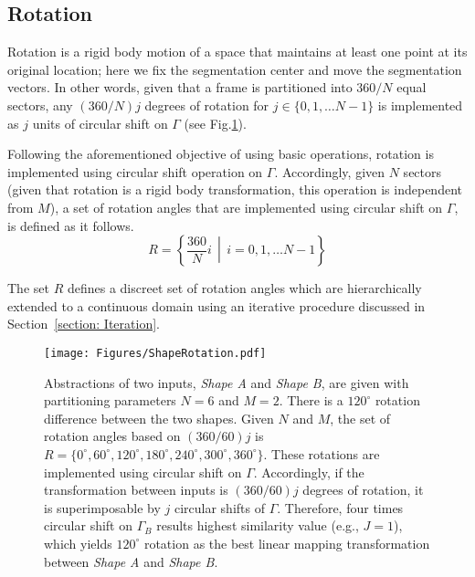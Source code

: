 \subsection{Rotation} \label{section: Rotation}
Rotation is a rigid body motion of a space that maintains at least one point at its original location; here we fix the segmentation center and move the segmentation vectors. In other words, given that a frame is partitioned into $360/N$ equal sectors, any $(360/N)j$ degrees of rotation for $j \in \{0, 1, \dots N-1\}$ is implemented as $j$ units of circular shift on $\Gamma$ (see Fig.\ref{Figure: ShapeRotation}).

Following the aforementioned objective of using basic operations, rotation is implemented using circular shift operation on $\Gamma$. Accordingly, given $N$ sectors (given that rotation is a rigid body transformation, this operation is independent from $M$), a set of rotation angles that are implemented using circular shift on $\Gamma$, is defined as it follows.
\begin{equation}
R = \left\{ \frac{360}{N}i \,\middle|\, i= 0, 1, \dots N-1 \right\}
\end{equation}

The set $R$ defines a discreet set of rotation angles which are hierarchically extended to a continuous domain using an iterative procedure discussed in Section~\ref{section: Iteration}.

\begin{figure}[!t]
	\centering
	\texttt{[image: Figures/ShapeRotation.pdf]}
	\caption
	{
		Abstractions of two inputs, \textit{Shape A} and \textit{Shape B}, are given with partitioning parameters $N=6$ and $M=2$. There is a $120^\circ$ rotation difference between the two shapes. Given $N$ and $M$, the set of rotation angles based on $(360/60)j$ is $R = \{0^\circ, 60^\circ, 120^\circ, 180^\circ, 240^\circ, 300^\circ, 360^\circ \}$. These rotations are implemented using circular shift on $\Gamma$. Accordingly, if the transformation between inputs is $(360/60)j$ degrees of rotation, it is superimposable by $j$ circular shifts of $\Gamma$. Therefore, four times circular shift on $\Gamma_B$ results highest similarity value (e.g., $J=1$), which yields $120^\circ$ rotation as the best linear mapping transformation between \textit{Shape A} and \textit{Shape B}.
	}
	\label{Figure: ShapeRotation}
\end{figure}





